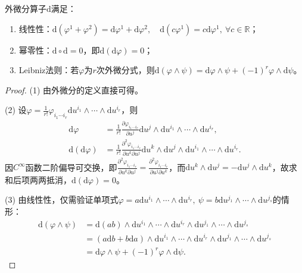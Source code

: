 \documentclass[../../main.tex]{subfiles}%
\begin{document}
\begin{theorem}
外微分算子$\mathrm{d}$满足：
\begin{enumerate}[(1)]
\item 线性性：$\mathrm{d}(\varphi^1+\varphi^2)=\mathrm{d}\varphi^1+\mathrm{d}\varphi^2,\quad \mathrm{d}(c\varphi^1)=c\mathrm{d}\varphi^1,\ \forall c\in\mathbb{R}$；
\item 幂零性：$\mathrm{d}\circ\mathrm{d}=0$，即$\mathrm{d}(\mathrm{d}\varphi)=0$；
\item Leibniz法则：若$\varphi$为$r$次外微分式，则$\mathrm{d}(\varphi\wedge\psi)=\mathrm{d}\varphi\wedge\psi+(-1)^r\varphi\wedge\mathrm{d}\psi$。
\end{enumerate}
\end{theorem}
\begin{proof}

(1) 由外微分的定义直接可得。

(2) 设$\varphi=\frac{1}{r!}\varphi_{i_1\cdots i_r}\mathrm{d}u^{i_1}\wedge\cdots\wedge\mathrm{d}u^{i_r}$，则
\begin{align*}
\mathrm{d}\varphi&=\frac{1}{r!}\frac{\partial\varphi_{i_1\cdots i_r}}{\partial u^j}\mathrm{d}u^j\wedge\mathrm{d}u^{i_1}\wedge\cdots\wedge\mathrm{d}u^{i_r},\\
\mathrm{d}(\mathrm{d}\varphi)&=\frac{1}{r!}\frac{\partial^2\varphi_{i_1\cdots i_r}}{\partial u^k\partial u^j}\mathrm{d}u^k\wedge\mathrm{d}u^j\wedge\mathrm{d}u^{i_1}\wedge\cdots\wedge\mathrm{d}u^{i_r}.
\end{align*}
因$C^\infty$函数二阶偏导可交换，即$\frac{\partial^2\varphi_{i_1\cdots i_r}}{\partial u^k\partial u^j}=\frac{\partial^2\varphi_{i_1\cdots i_r}}{\partial u^j\partial u^k}$，而$\mathrm{d}u^k\wedge\mathrm{d}u^j=-\mathrm{d}u^j\wedge\mathrm{d}u^k$，故求和后项两两抵消，$\mathrm{d}(\mathrm{d}\varphi)=0$。

(3) 由线性性，仅需验证单项式$\varphi=a\mathrm{d}u^{i_1}\wedge\cdots\wedge\mathrm{d}u^{i_r},\ \psi=b\mathrm{d}u^{j_1}\wedge\cdots\wedge\mathrm{d}u^{j_s}$的情形：
\begin{align*}
\mathrm{d}(\varphi\wedge\psi)&=\mathrm{d}(ab)\wedge\mathrm{d}u^{i_1}\wedge\cdots\wedge\mathrm{d}u^{i_r}\wedge\mathrm{d}u^{j_1}\wedge\cdots\wedge\mathrm{d}u^{j_s}\\
&=(a\mathrm{d}b+b\mathrm{d}a)\wedge\mathrm{d}u^{i_1}\wedge\cdots\wedge\mathrm{d}u^{i_r}\wedge\mathrm{d}u^{j_1}\wedge\cdots\wedge\mathrm{d}u^{j_s}\\
&=\mathrm{d}\varphi\wedge\psi+(-1)^r\varphi\wedge\mathrm{d}\psi.
\end{align*}

\end{proof}
\end{document}

